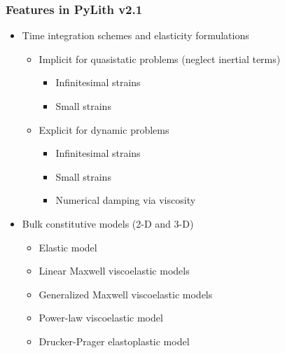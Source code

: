 \documentclass{beamer}
\begin{document}
\begin{frame}
  \frametitle{Features in PyLith v2.1}

  \begin{itemize}
  \item Time integration schemes and elasticity formulations
    \begin{itemize}
    \item Implicit for quasistatic problems (neglect inertial terms)
      \begin{itemize}
      \item Infinitesimal strains
      \item Small strains
      \end{itemize}
    \item Explicit for dynamic problems
      \begin{itemize}
      \item Infinitesimal strains
      \item Small strains
      \item Numerical damping via viscosity
     \end{itemize}
    \end{itemize}
  \item Bulk constitutive models (2-D and 3-D)
    \begin{itemize}
    \item Elastic model 
    \item Linear Maxwell viscoelastic models
    \item Generalized Maxwell viscoelastic models
    \item Power-law viscoelastic model
    \item Drucker-Prager elastoplastic model
    \end{itemize}
 \end{itemize}

\end{frame}
\end{document}
